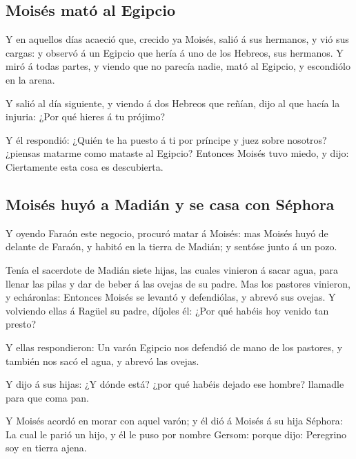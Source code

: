 \hypertarget{moisuxe9s-matuxf3-al-egipcio}{%
\subsection{Moisés mató al Egipcio}\label{moisuxe9s-matuxf3-al-egipcio}}

 Y en aquellos días acaeció que, crecido ya Moisés, salió
á sus hermanos, y vió sus cargas: y observó á un Egipcio que hería á uno
de los Hebreos, sus hermanos.  Y miró á todas partes, y
viendo que no parecía nadie, mató al Egipcio, y escondiólo en la arena.

 Y salió al día siguiente, y viendo á dos Hebreos que
reñían, dijo al que hacía la injuria: ¿Por qué hieres á tu prójimo?

 Y él respondió: ¿Quién te ha puesto á ti por príncipe y
juez sobre nosotros? ¿piensas matarme como mataste al Egipcio? Entonces
Moisés tuvo miedo, y dijo: Ciertamente esta cosa es descubierta.

\hypertarget{moisuxe9s-huyuxf3-a-madiuxe1n-y-se-casa-con-suxe9phora}{%
\subsection{Moisés huyó a Madián y se casa con
Séphora}\label{moisuxe9s-huyuxf3-a-madiuxe1n-y-se-casa-con-suxe9phora}}

 Y oyendo Faraón este negocio, procuró matar á Moisés:
mas Moisés huyó de delante de Faraón, y habitó en la tierra de Madián; y
sentóse junto á un pozo.

 Tenía el sacerdote de Madián siete hijas, las cuales
vinieron á sacar agua, para llenar las pilas y dar de beber á las ovejas
de su padre.  Mas los pastores vinieron, y echáronlas:
Entonces Moisés se levantó y defendiólas, y abrevó sus ovejas.
 Y volviendo ellas á Ragüel su padre, díjoles él: ¿Por
qué habéis hoy venido tan presto?

 Y ellas respondieron: Un varón Egipcio nos defendió de
mano de los pastores, y también nos sacó el agua, y abrevó las ovejas.

 Y dijo á sus hijas: ¿Y dónde está? ¿por qué habéis
dejado ese hombre? llamadle para que coma pan.

 Y Moisés acordó en morar con aquel varón; y él dió á
Moisés á su hija Séphora:  La cual le parió un hijo, y él
le puso por nombre Gersom: porque dijo: Peregrino soy en tierra ajena.

